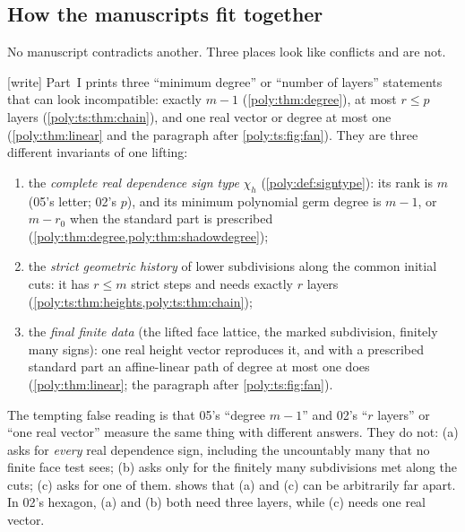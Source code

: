 \documentclass[11pt,a4paper]{article}
\numberwithin{equation}{section}
\theoremstyle{plain}
\newcommand{\wtag}{\textup{[write]}}%
\begin{document}
\subsection{How the manuscripts fit together}

No manuscript contradicts another. Three places look like conflicts and are
not.

\begin{remark}\label{poly:rem:threedegrees}
\wtag{} Part~I prints three ``minimum degree'' or ``number of layers''
statements that can look incompatible: exactly $m-1$ (\cref{poly:thm:degree}),
at most $r\le p$ layers (\cref{poly:ts:thm:chain}), and one real vector or
degree at most one (\cref{poly:thm:linear} and the paragraph after
\cref{poly:ts:fig:fan}). They are three different invariants of one lifting:
\begin{enumerate}[label=(\alph*)]
\item the \emph{complete real dependence sign type} $\chi_h$
(\cref{poly:def:signtype}): its rank is $m$ (05's letter; 02's $p$), and
its minimum polynomial germ degree is $m-1$, or $m-r_0$ when the standard
part is prescribed (\cref{poly:thm:degree,poly:thm:shadowdegree});
\item the \emph{strict geometric history} of lower subdivisions along the
common initial cuts: it has $r\le m$ strict steps and needs exactly $r$
layers (\cref{poly:ts:thm:heights,poly:ts:thm:chain});
\item the \emph{final finite data} (the lifted face lattice, the marked
subdivision, finitely many signs): one real height vector reproduces it,
and with a prescribed standard part an affine-linear path of degree at most
one does (\cref{poly:thm:linear}; the paragraph after
\cref{poly:ts:fig:fan}).
\end{enumerate}
The tempting false reading is that 05's ``degree $m-1$'' and 02's ``$r$
layers'' or ``one real vector'' measure the same thing with different
answers. They do not: (a) asks for \emph{every} real dependence sign,
including the uncountably many that no finite face test sees; (b) asks only
for the finitely many subdivisions met along the cuts; (c) asks for one of
them.  shows that (a) and (c) can be arbitrarily
far apart. In 02's hexagon, (a) and (b) both need three layers, while (c)
needs one real vector.
\end{remark}
\end{document}
